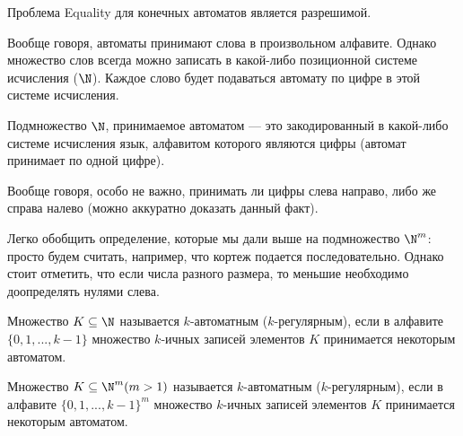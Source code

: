     \begin{Thm}
        Проблема Equality для конечных автоматов является разрешимой.
    \end{Thm}

    
    
    \begin{Rem}
        Вообще говоря, автоматы принимают слова в произвольном алфавите. Однако множество слов всегда можно записать в какой-либо позиционной системе исчисления ($\N$). Каждое слово будет подаваться автомату по цифре в этой системе исчисления.  
    \end{Rem}
    
    \begin{Def}[Подмножество $\N$]
        Подмножество $\N$, принимаемое автоматом --- это закодированный в какой-либо системе исчисления язык, алфавитом которого являются цифры (автомат принимает по одной цифре). 
    \end{Def}
    
    \begin{Rem}
        Вообще говоря, особо не важно, принимать ли цифры слева направо, либо же справа налево (можно аккуратно доказать данный факт).
    \end{Rem}
    
    \begin{Rem}
        Легко обобщить определение, которые мы дали выше на подмножество $\N^m$: просто будем считать, например, что кортеж подается последовательно. Однако стоит отметить, что если числа разного размера, то меньшие необходимо доопределять нулями слева.
    \end{Rem}
    
    \begin{Def}
        Множество $K \subseteq \N$ называется $k$-автоматным ($k$-регулярным), если в алфавите $\{0, 1, ..., k - 1\}$ множество $k$-ичных записей элементов $K$ принимается некоторым автоматом.
    \end{Def}
    
    \begin{Def}
        Множество $K \subseteq \N^m (m > 1)$ называется $k$-автоматным ($k$-регулярным), если в алфавите $\{0, 1, ..., k - 1\}^m$ множество $k$-ичных записей элементов $K$ принимается некоторым автоматом.
    \end{Def}

